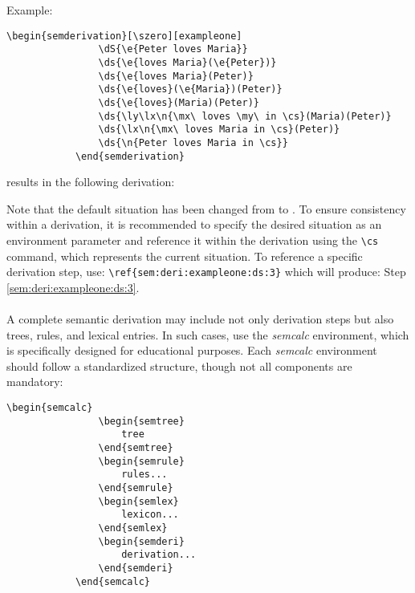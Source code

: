\documentclass[10pt, a4paper]{article}
\begin{document}
	Example:
	\begin{lstlisting}[style=B]
			\begin{semderivation}[\szero][exampleone]
				\dS{\e{Peter loves Maria}}
				\ds{\e{loves Maria}(\e{Peter})}
				\ds{\e{loves Maria}(Peter)}
				\ds{\e{loves}(\e{Maria})(Peter)}
				\ds{\e{loves}(Maria)(Peter)}
				\ds{\ly\lx\n{\mx\ loves \my\ in \cs}(Maria)(Peter)}
				\ds{\lx\n{\mx\ loves Maria in \cs}(Peter)}
				\ds{\n{Peter loves Maria in \cs}}
			\end{semderivation}
	\end{lstlisting} 
	results in the following derivation: \begin{semderivation}[\szero][exampleone]
	\end{semderivation}
	Note that the default situation has been changed from \sstar to \szero. To ensure consistency within a derivation, it is recommended to specify the desired situation as an environment parameter and reference it within the derivation using the \verb=\cs= command, which represents the current situation. To reference a specific derivation step, use:
	\verb=\ref{sem:deri:exampleone:ds:3}=
	which will produce: Step \ref{sem:deri:exampleone:ds:3}.
	\\\ \\
	A complete semantic derivation may include not only derivation steps but also trees, rules, and lexical entries. In such cases, use the \textit{semcalc} environment, which is specifically designed for educational purposes. Each \textit{semcalc} environment should follow a standardized structure, though not all components are mandatory:
	\begin{lstlisting}[style=B]
			\begin{semcalc}
				\begin{semtree}
					tree
				\end{semtree}
				\begin{semrule}
					rules...
				\end{semrule}
				\begin{semlex}
					lexicon...
				\end{semlex}
				\begin{semderi}
					derivation...
				\end{semderi}
			\end{semcalc}
	\end{lstlisting}
\end{document}

